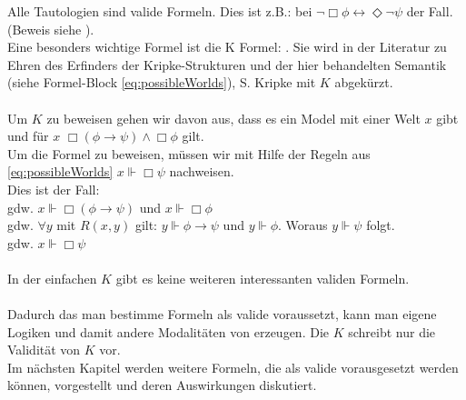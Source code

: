 %
Alle Tautologien sind valide Formeln.
Dies ist z.B.: bei $\neg \Box \phi \leftrightarrow \Diamond \neg \psi$ der Fall.
(Beweis siehe \cite[S.314]{huth2004logic}).\\
Eine besonders wichtige Formel ist die K Formel: \KFormel .
Sie wird in der Literatur zu Ehren des Erfinders der Kripke-Strukturen und der hier behandelten \PW Semantik (siehe Formel-Block \eqref{eq:possibleWorlds}), S. Kripke mit $K$ abgekürzt.\\
\\
Um $K$ zu beweisen gehen wir davon aus, dass es ein Model \modelFormel mit einer Welt $x$ gibt und für $x$ $\Box(\phi \rightarrow \psi) \wedge \Box \phi$ gilt.\\
Um die Formel zu beweisen, müssen wir mit Hilfe der Regeln aus \eqref{eq:possibleWorlds} $x \Vdash \Box \psi$ nachweisen.\\
Dies ist der Fall:\\
gdw. $x \Vdash \Box(\phi \rightarrow \psi)$ und $x \Vdash \Box \phi$\\
gdw. $\forall y$ mit $R(x,y)$ gilt: $y \Vdash \phi \rightarrow \psi$ und $y \Vdash \phi$. Woraus $y \Vdash \psi$ folgt.\\
gdw. $x \Vdash \Box \psi$\\
\\
In der einfachen \ML $K$ gibt es keine weiteren interessanten validen Formeln.\cite[S.314]{huth2004logic}\\
\\
Dadurch das man bestimme Formeln als valide voraussetzt, kann man eigene Logiken und damit andere Modalitäten von \true erzeugen.
Die \NML $K$ schreibt nur die Validität von $K$ vor.\\
Im nächsten Kapitel werden weitere Formeln, die als valide vorausgesetzt werden können, vorgestellt und deren Auswirkungen diskutiert.









